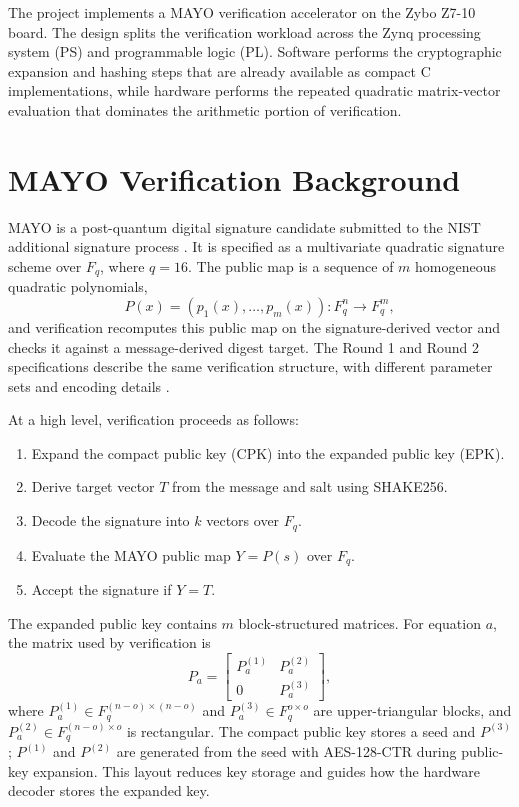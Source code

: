 \documentclass[conference]{IEEEtran}
\begin{document}
The project implements a MAYO verification accelerator on the Zybo Z7-10 board. The design splits the verification workload across the Zynq processing system (PS) and programmable logic (PL). Software performs the cryptographic expansion and hashing steps that are already available as compact C implementations, while hardware performs the repeated quadratic matrix-vector evaluation that dominates the arithmetic portion of verification.

\section{MAYO Verification Background}
MAYO is a post-quantum digital signature candidate submitted to the NIST additional signature process \cite{mayo,nistpqc}. It is specified as a multivariate quadratic signature scheme over \(F_q\), where \(q=16\). The public map is a sequence of \(m\) homogeneous quadratic polynomials,
\begin{equation}
P(x)=(p_1(x),\ldots,p_m(x)):F_q^n\rightarrow F_q^m,
\end{equation}
and verification recomputes this public map on the signature-derived vector and checks it against a message-derived digest target. The Round 1 and Round 2 specifications describe the same verification structure, with different parameter sets and encoding details \cite{mayo-r1,mayo-r2}.

At a high level, verification proceeds as follows:
\begin{enumerate}
\item Expand the compact public key (CPK) into the expanded public key (EPK).
\item Derive target vector \(T\) from the message and salt using SHAKE256.
\item Decode the signature into \(k\) vectors over \(F_q\).
\item Evaluate the MAYO public map \(Y=P(s)\) over \(F_q\).
\item Accept the signature if \(Y=T\).
\end{enumerate}

The expanded public key contains \(m\) block-structured matrices. For equation \(a\), the matrix used by verification is
\begin{equation}
P_a =
\begin{bmatrix}
P^{(1)}_a & P^{(2)}_a \\
0 & P^{(3)}_a
\end{bmatrix},
\end{equation}
where \(P^{(1)}_a\in F_q^{(n-o)\times(n-o)}\) and \(P^{(3)}_a\in F_q^{o\times o}\) are upper-triangular blocks, and \(P^{(2)}_a\in F_q^{(n-o)\times o}\) is rectangular. The compact public key stores a seed and \(P^{(3)}\); \(P^{(1)}\) and \(P^{(2)}\) are generated from the seed with AES-128-CTR during public-key expansion. This layout reduces key storage and guides how the hardware decoder stores the expanded key.
\end{document}
